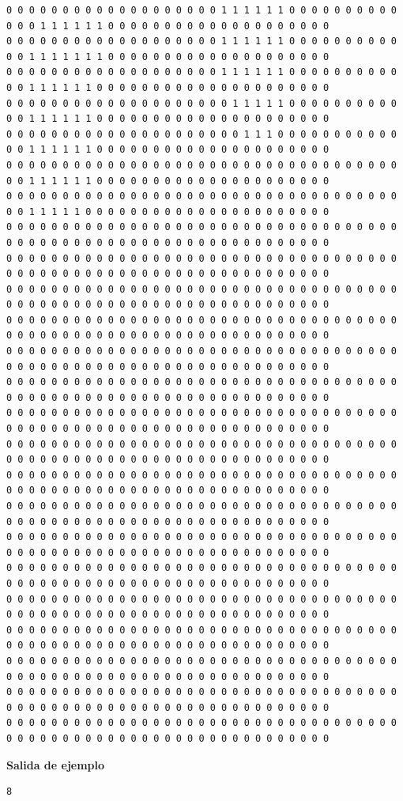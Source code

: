 \documentclass{oci}
\begin{document}
\begin{sampleDescription}
{\begin{verbatim}
0 0 0 0 0 0 0 0 0 0 0 0 0 0 0 0 0 0 0 1 1 1 1 1 1 0 0 0 0 0 0 0 0 0 0 0 0 0 1 1 1 1 1 1 0 0 0 0 0 0 0 0 0 0 0 0 0 0 0 0 0 0 0 0
0 0 0 0 0 0 0 0 0 0 0 0 0 0 0 0 0 0 0 1 1 1 1 1 1 0 0 0 0 0 0 0 0 0 0 0 0 1 1 1 1 1 1 1 0 0 0 0 0 0 0 0 0 0 0 0 0 0 0 0 0 0 0 0
0 0 0 0 0 0 0 0 0 0 0 0 0 0 0 0 0 0 0 1 1 1 1 1 1 0 0 0 0 0 0 0 0 0 0 0 0 1 1 1 1 1 1 0 0 0 0 0 0 0 0 0 0 0 0 0 0 0 0 0 0 0 0 0
0 0 0 0 0 0 0 0 0 0 0 0 0 0 0 0 0 0 0 0 1 1 1 1 1 0 0 0 0 0 0 0 0 0 0 0 0 1 1 1 1 1 1 0 0 0 0 0 0 0 0 0 0 0 0 0 0 0 0 0 0 0 0 0
0 0 0 0 0 0 0 0 0 0 0 0 0 0 0 0 0 0 0 0 0 1 1 1 0 0 0 0 0 0 0 0 0 0 0 0 0 1 1 1 1 1 1 0 0 0 0 0 0 0 0 0 0 0 0 0 0 0 0 0 0 0 0 0
0 0 0 0 0 0 0 0 0 0 0 0 0 0 0 0 0 0 0 0 0 0 0 0 0 0 0 0 0 0 0 0 0 0 0 0 0 1 1 1 1 1 1 0 0 0 0 0 0 0 0 0 0 0 0 0 0 0 0 0 0 0 0 0
0 0 0 0 0 0 0 0 0 0 0 0 0 0 0 0 0 0 0 0 0 0 0 0 0 0 0 0 0 0 0 0 0 0 0 0 0 1 1 1 1 1 0 0 0 0 0 0 0 0 0 0 0 0 0 0 0 0 0 0 0 0 0 0
0 0 0 0 0 0 0 0 0 0 0 0 0 0 0 0 0 0 0 0 0 0 0 0 0 0 0 0 0 0 0 0 0 0 0 0 0 0 0 0 0 0 0 0 0 0 0 0 0 0 0 0 0 0 0 0 0 0 0 0 0 0 0 0
0 0 0 0 0 0 0 0 0 0 0 0 0 0 0 0 0 0 0 0 0 0 0 0 0 0 0 0 0 0 0 0 0 0 0 0 0 0 0 0 0 0 0 0 0 0 0 0 0 0 0 0 0 0 0 0 0 0 0 0 0 0 0 0
0 0 0 0 0 0 0 0 0 0 0 0 0 0 0 0 0 0 0 0 0 0 0 0 0 0 0 0 0 0 0 0 0 0 0 0 0 0 0 0 0 0 0 0 0 0 0 0 0 0 0 0 0 0 0 0 0 0 0 0 0 0 0 0
0 0 0 0 0 0 0 0 0 0 0 0 0 0 0 0 0 0 0 0 0 0 0 0 0 0 0 0 0 0 0 0 0 0 0 0 0 0 0 0 0 0 0 0 0 0 0 0 0 0 0 0 0 0 0 0 0 0 0 0 0 0 0 0
0 0 0 0 0 0 0 0 0 0 0 0 0 0 0 0 0 0 0 0 0 0 0 0 0 0 0 0 0 0 0 0 0 0 0 0 0 0 0 0 0 0 0 0 0 0 0 0 0 0 0 0 0 0 0 0 0 0 0 0 0 0 0 0
0 0 0 0 0 0 0 0 0 0 0 0 0 0 0 0 0 0 0 0 0 0 0 0 0 0 0 0 0 0 0 0 0 0 0 0 0 0 0 0 0 0 0 0 0 0 0 0 0 0 0 0 0 0 0 0 0 0 0 0 0 0 0 0
0 0 0 0 0 0 0 0 0 0 0 0 0 0 0 0 0 0 0 0 0 0 0 0 0 0 0 0 0 0 0 0 0 0 0 0 0 0 0 0 0 0 0 0 0 0 0 0 0 0 0 0 0 0 0 0 0 0 0 0 0 0 0 0
0 0 0 0 0 0 0 0 0 0 0 0 0 0 0 0 0 0 0 0 0 0 0 0 0 0 0 0 0 0 0 0 0 0 0 0 0 0 0 0 0 0 0 0 0 0 0 0 0 0 0 0 0 0 0 0 0 0 0 0 0 0 0 0
0 0 0 0 0 0 0 0 0 0 0 0 0 0 0 0 0 0 0 0 0 0 0 0 0 0 0 0 0 0 0 0 0 0 0 0 0 0 0 0 0 0 0 0 0 0 0 0 0 0 0 0 0 0 0 0 0 0 0 0 0 0 0 0
0 0 0 0 0 0 0 0 0 0 0 0 0 0 0 0 0 0 0 0 0 0 0 0 0 0 0 0 0 0 0 0 0 0 0 0 0 0 0 0 0 0 0 0 0 0 0 0 0 0 0 0 0 0 0 0 0 0 0 0 0 0 0 0
0 0 0 0 0 0 0 0 0 0 0 0 0 0 0 0 0 0 0 0 0 0 0 0 0 0 0 0 0 0 0 0 0 0 0 0 0 0 0 0 0 0 0 0 0 0 0 0 0 0 0 0 0 0 0 0 0 0 0 0 0 0 0 0
0 0 0 0 0 0 0 0 0 0 0 0 0 0 0 0 0 0 0 0 0 0 0 0 0 0 0 0 0 0 0 0 0 0 0 0 0 0 0 0 0 0 0 0 0 0 0 0 0 0 0 0 0 0 0 0 0 0 0 0 0 0 0 0
0 0 0 0 0 0 0 0 0 0 0 0 0 0 0 0 0 0 0 0 0 0 0 0 0 0 0 0 0 0 0 0 0 0 0 0 0 0 0 0 0 0 0 0 0 0 0 0 0 0 0 0 0 0 0 0 0 0 0 0 0 0 0 0
0 0 0 0 0 0 0 0 0 0 0 0 0 0 0 0 0 0 0 0 0 0 0 0 0 0 0 0 0 0 0 0 0 0 0 0 0 0 0 0 0 0 0 0 0 0 0 0 0 0 0 0 0 0 0 0 0 0 0 0 0 0 0 0
0 0 0 0 0 0 0 0 0 0 0 0 0 0 0 0 0 0 0 0 0 0 0 0 0 0 0 0 0 0 0 0 0 0 0 0 0 0 0 0 0 0 0 0 0 0 0 0 0 0 0 0 0 0 0 0 0 0 0 0 0 0 0 0
0 0 0 0 0 0 0 0 0 0 0 0 0 0 0 0 0 0 0 0 0 0 0 0 0 0 0 0 0 0 0 0 0 0 0 0 0 0 0 0 0 0 0 0 0 0 0 0 0 0 0 0 0 0 0 0 0 0 0 0 0 0 0 0
0 0 0 0 0 0 0 0 0 0 0 0 0 0 0 0 0 0 0 0 0 0 0 0 0 0 0 0 0 0 0 0 0 0 0 0 0 0 0 0 0 0 0 0 0 0 0 0 0 0 0 0 0 0 0 0 0 0 0 0 0 0 0 0
\end{verbatim}
}

{\bf Salida de ejemplo}
\begin{verbatim}
8
\end{verbatim}
\end{sampleDescription}
\end{document}
